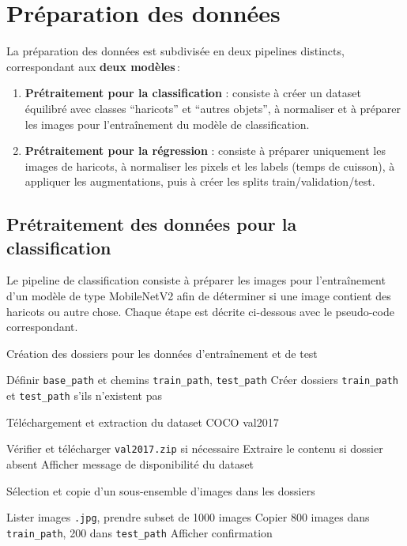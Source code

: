 \section{Préparation des données}
\label{sec:pretraitement}

La préparation des données est subdivisée en deux pipelines distincts, correspondant aux \textbf{deux modèles} :

\begin{enumerate}
	\item \textbf{Prétraitement pour la classification} : consiste à créer un dataset équilibré avec classes “haricots” et “autres objets”, à normaliser et à préparer les images pour l’entraînement du modèle de classification.
	\item \textbf{Prétraitement pour la régression} : consiste à préparer uniquement les images de haricots, à normaliser les pixels et les labels (temps de cuisson), à appliquer les augmentations, puis à créer les splits train/validation/test.
\end{enumerate}

\subsection{Prétraitement des données pour la classification}

Le pipeline de classification consiste à préparer les images pour l'entraînement d'un modèle de type MobileNetV2 afin de déterminer si une image contient des haricots ou autre chose. Chaque étape est décrite ci-dessous avec le pseudo-code correspondant.


\begin{algorithm}[H]
\caption{Création des dossiers pour les données d'entraînement et de test}
Définir \texttt{base\_path} et chemins \texttt{train\_path}, \texttt{test\_path}\;
Créer dossiers \texttt{train\_path} et \texttt{test\_path} s'ils n'existent pas\;
\end{algorithm}

\begin{algorithm}[H]
\caption{Téléchargement et extraction du dataset COCO val2017}
Vérifier et télécharger \texttt{val2017.zip} si nécessaire\;
Extraire le contenu si dossier absent\;
Afficher message de disponibilité du dataset\;
\end{algorithm}

\begin{algorithm}[H]
\caption{Sélection et copie d'un sous-ensemble d'images dans les dossiers}
Lister images \texttt{.jpg}, prendre subset de 1000 images\;
Copier 800 images dans \texttt{train\_path}, 200 dans \texttt{test\_path}\;
Afficher confirmation\;
\end{algorithm}

